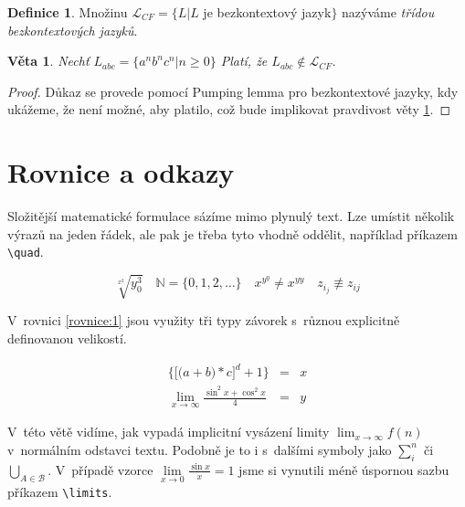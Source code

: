 \documentclass[a4paper, 11pt]{article}
\theoremstyle{plain}
\theoremstyle{definition}
\newtheorem{definice}[noreset]{Definice}
\theoremstyle{plain}
\newtheorem{veta}{Věta}
\begin{document}
\begin{definice}
Množinu $\mathcal{L}_{CF} = \{L|L$ je bezkontextový jazyk$\}$ nazýváme \emph{třídou bezkontextových jazyků}.
\end{definice}

\begin{veta}\label{veta:1}
Nechť $L_{abc} = \{a^nb^nc^n|n \geq 0\}$ Platí, že $L_{abc} \notin \mathcal{L}_{CF}$.
\end{veta}

\begin{proof}
  Důkaz se provede pomocí Pumping lemma pro bezkontextové jazyky, kdy ukážeme, že není možné, aby platilo, což bude implikovat pravdivost věty \ref{veta:1}.
\end{proof}

\section{Rovnice a odkazy}

Složitější matematické formulace sázíme mimo plynulý text. Lze umístit několik výrazů na jeden řádek, ale pak je třeba tyto vhodně oddělit, například příkazem \verb|\quad|.

$$\sqrt[x^2]{y_0^3} \quad \mathbb{N} = \{0,1,2,\ldots\} \quad x^{y^y} \neq x^{yy} \quad z_{i_j} \not\equiv z_{ij}$$

V~rovnici \eqref{rovnice:1} jsou využity tři typy závorek s~různou explicitně definovanou velikostí.

\begin{eqnarray}\label{rovnice:1} %
\bigg\{ \Big[ \big(a+b\big)*c \Big]^d+1\bigg\} & = & x \\
\nonumber \lim_{x \to \infty} \frac{\sin^2 x + \cos^2 x}{4} & = & y
\end{eqnarray}

V~této větě vidíme, jak vypadá implicitní vysázení limity $\lim_{x \to \infty} f(n)$ v~normálním odstavci textu. Podobně je to i s~dalšími symboly jako $\sum _{i}^n$ či $\bigcup_{A \in \mathcal{B}}$. V~případě vzorce $\lim\limits_{x \to 0} \frac{\sin x}{x} = 1$ jsme si vynutili méně úspornou sazbu příkazem \verb|\limits|.
\end{document}

